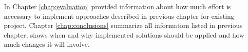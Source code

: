 In Chapter \ref{chap:evaluation} provided information about how much effort is
necessary to implement approaches described in previous chapter for existing
project. Chapter \ref{chap:conclusions} summarize all information listed in
previous chapter, shows when and why implemented solutions should be applied and
how much changes it will involve.









